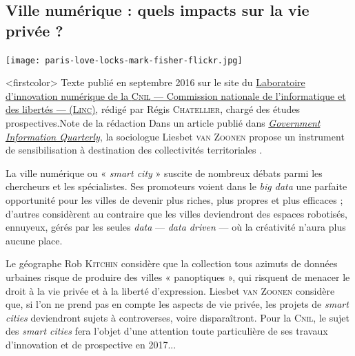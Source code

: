 

\subsection[Ville numérique et vie privée]{Ville numérique : quels impacts sur la vie privée ?}
\label{sub:I.4.2}

\noindent\texttt{[image: paris-love-locks-mark-fisher-flickr.jpg]}

\caution[t]<firstcolor>{%
Texte publié en septembre 2016 sur le site du \href{https://linc.cnil.fr/fr/ville-numerique-quels-impacts-sur-la-vie-privee}{Laboratoire d'innovation numérique de la \textsc{Cnil} --- Commission nationale de l'informatique et des libertés --- (\textsc{Linc})}, rédigé par Régis \textsc{Chatellier}, chargé des études prospectives.}{Note de la rédaction}
Dans un article publié dans \href{./Documents/Chapter01/van-zoonen-2016.pdf}{\textit{Government Information Quarterly}}, la sociologue Liesbet \textsc{van Zoonen} propose un instrument de sensibilisation à destination des collectivités territoriales \parencite{vanZoonen:2016}. 

La ville numérique ou « \textit{smart city} » suscite de nombreux débats parmi les chercheurs et les spécialistes. Ses promoteurs voient dans le \textit{big data} une parfaite opportunité pour les villes de devenir plus riches, plus propres et plus efficaces ; d’autres considèrent au contraire que les villes deviendront des espaces robotisés, ennuyeux, gérés par les seules \textit{data} --- \textit{data driven} --- où la créativité n’aura plus aucune place.

Le géographe Rob \textsc{Kitchin} considère que la collection tous azimuts de données urbaines risque de produire des villes « panoptiques », qui risquent de menacer le droit à la vie privée et à la liberté d’expression. Liesbet \textsc{van Zoonen} considère que, si l’on ne prend pas en compte les aspects de vie privée, les projets de \textit{smart cities} deviendront sujets à controverses, voire disparaîtront. Pour la \textsc{Cnil}, le sujet des \textit{smart cities} fera l’objet d’une attention toute particulière de ses travaux d'innovation et de prospective en 2017...

